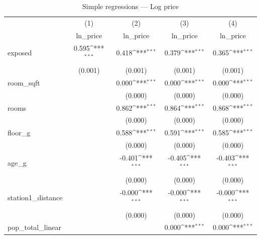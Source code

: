 \begin{table}[htbp]\centering
\def\sym#1{\ifmmode^{#1}\else\(^{#1}\)\fi}
\caption{Simple regressions — Log price}
\begin{tabular}{l*{4}{c}}
\toprule
                    &\multicolumn{1}{c}{(1)}&\multicolumn{1}{c}{(2)}&\multicolumn{1}{c}{(3)}&\multicolumn{1}{c}{(4)}\\
                    &\multicolumn{1}{c}{ln\_price}&\multicolumn{1}{c}{ln\_price}&\multicolumn{1}{c}{ln\_price}&\multicolumn{1}{c}{ln\_price}\\
\midrule
exposed             &       0.595\sym{***}&       0.418\sym{***}&       0.379\sym{***}&       0.365\sym{***}\\
                    &     (0.001)         &     (0.001)         &     (0.001)         &     (0.001)         \\
\addlinespace
room\_sqft           &                     &       0.000\sym{***}&       0.000\sym{***}&       0.000\sym{***}\\
                    &                     &     (0.000)         &     (0.000)         &     (0.000)         \\
\addlinespace
rooms               &                     &       0.862\sym{***}&       0.864\sym{***}&       0.868\sym{***}\\
                    &                     &     (0.000)         &     (0.000)         &     (0.000)         \\
\addlinespace
floor\_g             &                     &       0.588\sym{***}&       0.591\sym{***}&       0.585\sym{***}\\
                    &                     &     (0.000)         &     (0.000)         &     (0.000)         \\
\addlinespace
age\_g               &                     &      -0.401\sym{***}&      -0.405\sym{***}&      -0.403\sym{***}\\
                    &                     &     (0.000)         &     (0.000)         &     (0.000)         \\
\addlinespace
station1\_distance   &                     &      -0.000\sym{***}&      -0.000\sym{***}&      -0.000\sym{***}\\
                    &                     &     (0.000)         &     (0.000)         &     (0.000)         \\
\addlinespace
pop\_total\_linear    &                     &                     &       0.000\sym{***}&       0.000\sym{***}\\

\end{tabular}
\end{table}
